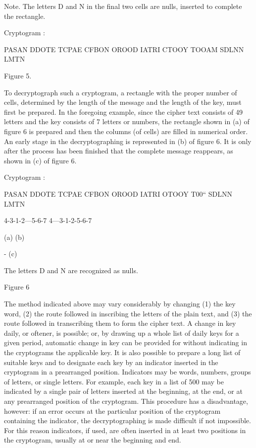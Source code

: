  

 

 

 

 

 

 

 

 

Note. The letters D and N in the final two cells are nulls, inserted to complete
the rectangle.

Cryptogram :

PASAN DDOTE TCPAE CFBON OROOD IATRI CTOOY
TOOAM SDLNN LMTN

Figure 5.

\mypara To decryptograph such a cryptogram, a rectangle with the proper
number of cells, determined by the length of the message and the length
of the key, must first be prepared. In the foregoing example, since the
cipher text consists of 49 letters and the key consists of 7 letters or numbers, the rectangle shown in (a) of figure 6 is prepared and then the
columns (of cells) are filled in numerical order. An early stage in the
decryptographing is represented in (b) of figure 6. It is only after the
process has been finished that the complete message reappears, as shown
in (c) of figure 6.

Cryptogram :

PASAN DDOTE TCPAE CFBON OROOD IATRI OTOOY T00“
SDLNN LMTN

4-3-1-2—5-6-7 4—3-1-2-5-6-7

(a)
(b)

- (c)

The letters D and N are recognized as nulls.
 

Figure 6



\mypara The method indicated above may vary considerably by changing
(1) the key word, (2) the route followed in inscribing the letters of the
plain text, and (3) the route followed in transcribing them to form the
cipher text. A change in key daily, or oftener, is possible; or, by drawing
up a whole list of daily keys for a given period, automatic change in key
can be provided for without indicating in the cryptograms the applicable
key. It is also possible to prepare a long list of suitable keys and to
designate each key by an indicator inserted in the cryptogram in a prearranged position. Indicators may be words, numbers, groups of letters,
or single letters. For example, each key in a list of 500 may be indicated
by a single pair of letters inserted at the beginning, at the end, or at any
prearranged position of the cryptogram. This procedure has a disadvantage, however: if an error occurs at the particular position of the cryptogram containing the indicator, the decryptographing is made difficult if
not impossible. For this reason indicators, if used, are often inserted
in at least two positions in the cryptogram, usually at or near the
beginning and end.


